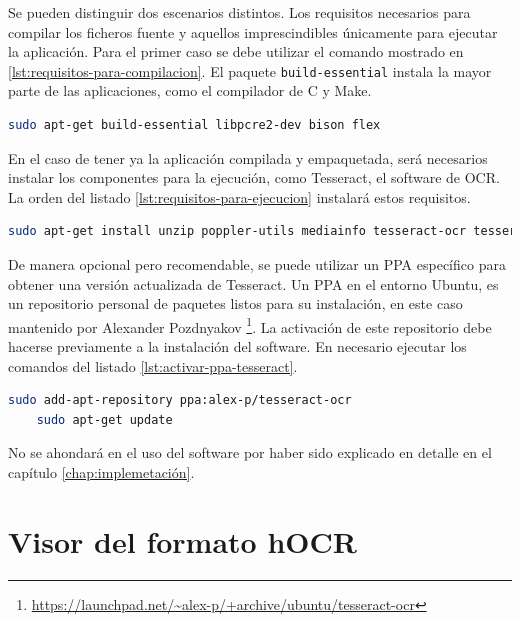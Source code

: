 Se pueden distinguir dos escenarios distintos. Los requisitos necesarios para compilar los ficheros fuente y aquellos imprescindibles únicamente para ejecutar la aplicación. Para el primer caso se debe utilizar el comando mostrado en \ref{lst:requisitos-para-compilacion}. El paquete \verb|build-essential| instala la mayor parte de las aplicaciones, como el compilador de C y Make.

\begin{lstlisting}[language=bash,caption={Dependencias para la compilación},label=lst:requisitos-para-compilacion]
    sudo apt-get build-essential libpcre2-dev bison flex
\end{lstlisting}

En el caso de tener ya la aplicación compilada y empaquetada, será necesarios instalar los componentes para la ejecución, como Tesseract, el software de OCR. La orden del listado \ref{lst:requisitos-para-ejecucion} instalará estos requisitos.

\begin{lstlisting}[language=bash,caption={Dependencias para la ejecución},label=lst:requisitos-para-ejecucion]
    sudo apt-get install unzip poppler-utils mediainfo tesseract-ocr tesseract-ocr-spa jq python3-opencv jq bc
\end{lstlisting}

De manera opcional pero recomendable, se puede utilizar un PPA específico para obtener una versión actualizada de Tesseract. Un PPA en el entorno Ubuntu, es un repositorio personal de paquetes listos para su instalación, en este caso mantenido por Alexander Pozdnyakov \footnote{\url{https://launchpad.net/~alex-p/+archive/ubuntu/tesseract-ocr}}. La activación de este repositorio debe hacerse previamente a la instalación del software. En necesario ejecutar los comandos del listado \ref{lst:activar-ppa-tesseract}.

\begin{lstlisting}[language=bash,caption={Activar PPA de Tesseract},label=lst:activar-ppa-tesseract]
    sudo add-apt-repository ppa:alex-p/tesseract-ocr
    sudo apt-get update
\end{lstlisting}

No se ahondará en el uso del software por haber sido explicado en detalle en el capítulo \ref{chap:implemetación}.

\section{Visor del formato hOCR}

